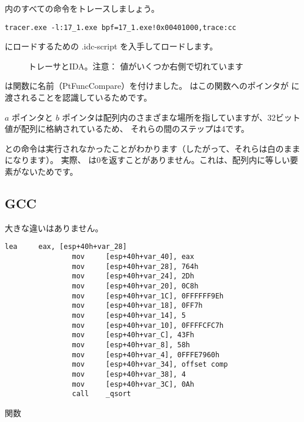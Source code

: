 \comp 内のすべての命令をトレースしましょう。

\begin{lstlisting}
tracer.exe -l:17_1.exe bpf=17_1.exe!0x00401000,trace:cc
\end{lstlisting}

\IDA にロードするための .idc-script を入手してロードします。

\begin{figure}[H]
\centering
{}
\caption{トレーサとIDA。注意：
値がいくつか右側で切れています}
\label{fig:qsort_tracer_cc}
\end{figure}

\IDA は関数に名前（PtFuncCompare）を付けました。 \IDA はこの関数へのポインタが \qsort に渡されることを認識しているためです。

$a$ ポインタと $b$ ポインタは配列内のさまざまな場所を指していますが、32ビット値が配列に格納されているため、
それらの間のステップは4です。

との命令は実行されなかったことがわかります（したがって、それらは白のままになります）。
実際、 \comp は0を返すことがありません。これは、配列内に等しい要素がないためです。

\subsection{GCC}

大きな違いはありません。

\begin{lstlisting}[caption=GCC,style=customasmx86]
                lea     eax, [esp+40h+var_28]
                mov     [esp+40h+var_40], eax
                mov     [esp+40h+var_28], 764h
                mov     [esp+40h+var_24], 2Dh
                mov     [esp+40h+var_20], 0C8h
                mov     [esp+40h+var_1C], 0FFFFFF9Eh
                mov     [esp+40h+var_18], 0FF7h
                mov     [esp+40h+var_14], 5
                mov     [esp+40h+var_10], 0FFFFCFC7h
                mov     [esp+40h+var_C], 43Fh
                mov     [esp+40h+var_8], 58h
                mov     [esp+40h+var_4], 0FFFE7960h
                mov     [esp+40h+var_34], offset comp
                mov     [esp+40h+var_38], 4
                mov     [esp+40h+var_3C], 0Ah
                call    _qsort
\end{lstlisting}

\comp 関数

